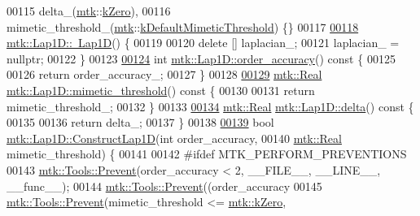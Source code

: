 \begin{DoxyCode}
00115   delta\_(\hyperlink{namespacemtk}{mtk}::\hyperlink{group__c01-roots_ga59a451a5fae30d59649bcda274fea271}{kZero}),
00116   mimetic\_threshold\_(\hyperlink{namespacemtk}{mtk}::\hyperlink{group__c01-roots_ga35718d949bdc81a08a9cc8ebbe3478a2}{kDefaultMimeticThreshold}) \{\}
00117 
\hypertarget{mtk__lap__1d_8cc_source_l00118}{}\hyperlink{classmtk_1_1Lap1D_ac0cb868243a66658cc46de5b818fa4e8}{00118} \hyperlink{classmtk_1_1Lap1D_ac0cb868243a66658cc46de5b818fa4e8}{mtk::Lap1D::~Lap1D}() \{
00119 
00120   \textcolor{keyword}{delete} [] laplacian\_;
00121   laplacian\_ = \textcolor{keyword}{nullptr};
00122 \}
00123 
\hypertarget{mtk__lap__1d_8cc_source_l00124}{}\hyperlink{classmtk_1_1Lap1D_ae3490534a9e950df3f81b3840c31b13a}{00124} \textcolor{keywordtype}{int} \hyperlink{classmtk_1_1Lap1D_ae3490534a9e950df3f81b3840c31b13a}{mtk::Lap1D::order\_accuracy}()\textcolor{keyword}{ const }\{
00125 
00126   \textcolor{keywordflow}{return} order\_accuracy\_;
00127 \}
00128 
\hypertarget{mtk__lap__1d_8cc_source_l00129}{}\hyperlink{classmtk_1_1Lap1D_a957ae4ff6053d605ac7b93650ad6f188}{00129} \hyperlink{group__c01-roots_gac080bbbf5cbb5502c9f00405f894857d}{mtk::Real} \hyperlink{classmtk_1_1Lap1D_a957ae4ff6053d605ac7b93650ad6f188}{mtk::Lap1D::mimetic\_threshold}()\textcolor{keyword}{ const }\{
00130 
00131   \textcolor{keywordflow}{return} mimetic\_threshold\_;
00132 \}
00133 
\hypertarget{mtk__lap__1d_8cc_source_l00134}{}\hyperlink{classmtk_1_1Lap1D_a4e16e80c6dd845ac42bda23385a1c56e}{00134} \hyperlink{group__c01-roots_gac080bbbf5cbb5502c9f00405f894857d}{mtk::Real} \hyperlink{classmtk_1_1Lap1D_a4e16e80c6dd845ac42bda23385a1c56e}{mtk::Lap1D::delta}()\textcolor{keyword}{ const }\{
00135 
00136   \textcolor{keywordflow}{return} delta\_;
00137 \}
00138 
\hypertarget{mtk__lap__1d_8cc_source_l00139}{}\hyperlink{classmtk_1_1Lap1D_a685dcba88c08cf5b7b6c2aa4669a472c}{00139} \textcolor{keywordtype}{bool} \hyperlink{classmtk_1_1Lap1D_a685dcba88c08cf5b7b6c2aa4669a472c}{mtk::Lap1D::ConstructLap1D}(\textcolor{keywordtype}{int} order\_accuracy,
00140                                 \hyperlink{group__c01-roots_gac080bbbf5cbb5502c9f00405f894857d}{mtk::Real} mimetic\_threshold) \{
00141 
00142 \textcolor{preprocessor}{  #ifdef MTK\_PERFORM\_PREVENTIONS}
00143   \hyperlink{classmtk_1_1Tools_a332324c6f25e66be9dff48c5987a3b9f}{mtk::Tools::Prevent}(order\_accuracy < 2, \_\_FILE\_\_, \_\_LINE\_\_, \_\_func\_\_);
00144   \hyperlink{classmtk_1_1Tools_a332324c6f25e66be9dff48c5987a3b9f}{mtk::Tools::Prevent}((order\_accuracy%
00145   \hyperlink{classmtk_1_1Tools_a332324c6f25e66be9dff48c5987a3b9f}{mtk::Tools::Prevent}(mimetic\_threshold <= \hyperlink{group__c01-roots_ga59a451a5fae30d59649bcda274fea271}{mtk::kZero},

\end{DoxyCode}
